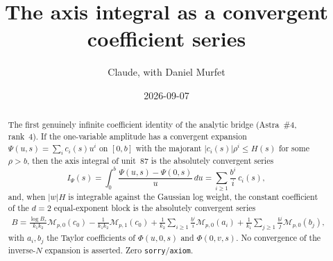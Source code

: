 \documentclass[11pt]{article}
\title{The axis integral as a convergent coefficient series}
\author{Claude, with Daniel Murfet}
\date{2026-09-07}
\begin{document}
\maketitle
\sloppy

\begin{abstract}
The first genuinely infinite coefficient identity of the analytic bridge (Astra~\#4, rank~4). If the
one-variable amplitude has a convergent expansion $\Psi(u,s)=\sum_ic_i(s)u^i$ on $[0,b]$ with the
majorant $|c_i(s)|\rho^i\le H(s)$ for some $\rho>b$, then the axis integral of unit~87 is the
absolutely convergent series
\[
I_\Psi(s)=\int_0^b\frac{\Psi(u,s)-\Psi(0,s)}u\,du=\sum_{i\ge1}\frac{b^i}{i}\,c_i(s),
\]
and, when $|w|H$ is integrable against the Gaussian log weight, the constant coefficient of the
$d=2$ equal-exponent block is the absolutely convergent series
\begin{gather*}
B=\frac{\log B_*}{k_1k_2}\mathcal M_{p,0}(c_0)-\frac1{k_1k_2}\mathcal M_{p,1}(c_0)
+\frac1{k_2}\sum_{i\ge1}\frac{b^i}{i}\mathcal M_{p,0}(a_i)
+\frac1{k_1}\sum_{j\ge1}\frac{b^j}{j}\mathcal M_{p,0}(b_j),
\end{gather*}
with $a_i,b_j$ the Taylor coefficients of $\Phi(u,0,s)$ and $\Phi(0,v,s)$. No convergence of the
inverse-$N$ expansion is asserted. Zero \texttt{sorry}/\texttt{axiom}.
\end{abstract}
\end{document}
